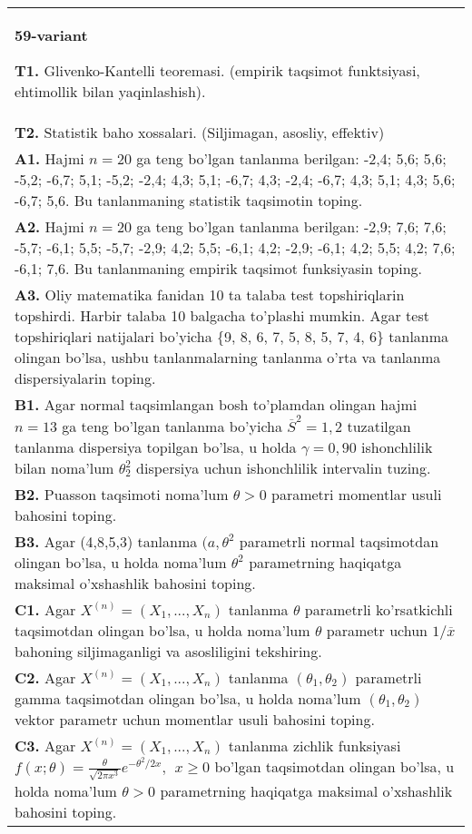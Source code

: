 \documentclass{article}
\begin{document}
\begin{tabular}{m{17cm}}
\textbf{59-variant}
\newline

\textbf{T1.} 
Glivenko-Kantelli teoremasi. (empirik taqsimot funktsiyasi, ehtimollik bilan yaqinlashish).
\\
\textbf{T2.} 
Statistik baho xossalari. (Siljimagan, asosliy, effektiv)
\\
\textbf{A1.} 
Hajmi \(n = 20\) ga teng bo'lgan tanlanma berilgan: -2,4; 5,6; 5,6; -5,2; -6,7; 5,1; -5,2; -2,4; 4,3; 5,1; -6,7; 4,3; -2,4; -6,7; 4,3; 5,1; 4,3; 5,6; -6,7; 5,6. Bu tanlanmaning statistik taqsimotin toping.
\\
\textbf{A2.} 
Hajmi \(n = 20\) ga teng bo'lgan tanlanma berilgan: -2,9; 7,6; 7,6; -5,7; -6,1; 5,5; -5,7; -2,9; 4,2; 5,5; -6,1; 4,2; -2,9; -6,1; 4,2; 5,5; 4,2; 7,6; -6,1; 7,6. Bu tanlanmaning empirik taqsimot funksiyasin toping.
\\
\textbf{A3.} 
Oliy matematika fanidan 10 ta talaba test topshiriqlarin topshirdi. Harbir talaba 10 balgacha to'plashi mumkin. Agar test topshiriqlari natijalari bo'yicha \{9, 8, 6, 7, 5, 8, 5, 7, 4, 6\} tanlanma olingan bo'lsa, ushbu tanlanmalarning tanlanma o'rta va tanlanma dispersiyalarin toping.
\\
\textbf{B1.} 
Agar normal taqsimlangan bosh to'plamdan olingan hajmi \(n = 13\) ga teng bo'lgan tanlanma bo'yicha \({\overline{S}}^{2} = 1,2\) tuzatilgan tanlanma dispersiya topilgan bo'lsa, u holda \(\gamma = 0,90\) ishonchlilik bilan noma'lum \(\theta_{2}^{2}\) dispersiya uchun ishonchlilik intervalin tuzing.
\\
\textbf{B2.} 
Puasson taqsimoti noma'lum \(\theta > 0\) parametri momentlar usuli bahosini toping.
\\
\textbf{B3.} 
Agar (4,8,5,3) tanlanma \((a,\theta^{2}\) parametrli normal taqsimotdan olingan bo'lsa, u holda noma'lum \(\theta^{2}\) parametrning haqiqatga maksimal o'xshashlik bahosini toping.
\\
\textbf{C1.} 
Agar \(X^{(n)} = \left( X_{1},...,X_{n} \right)\) tanlanma \(\theta\) parametrli ko'rsatkichli taqsimotdan olingan bo'lsa, u holda noma'lum \(\theta\) parametr uchun \(1/\overline{x}\) bahoning siljimaganligi va asosliligini tekshiring.
\\
\textbf{C2.} 
Agar \(X^{(n)} = \left( X_{1},...,X_{n} \right)\) tanlanma \(\left( \theta_{1},\theta_{2} \right)\) parametrli gamma taqsimotdan olingan bo'lsa, u holda noma'lum \(\left( \theta_{1},\theta_{2} \right)\) vektor parametr uchun momentlar usuli bahosini toping.
\\
\textbf{C3.} 
Agar \(X^{(n)} = \left( X_{1},...,X_{n} \right)\) tanlanma zichlik funksiyasi \(f(x;\theta) = \frac{\theta}{\sqrt{2\pi x^{3}}}e^{- \theta^{2}/2x},\ \ x \geq 0\) bo'lgan taqsimotdan olingan bo'lsa, u holda noma'lum \(\theta > 0\) parametrning haqiqatga maksimal o'xshashlik bahosini toping.
\\

\end{tabular}
\vspace{1cm}
\end{document}
